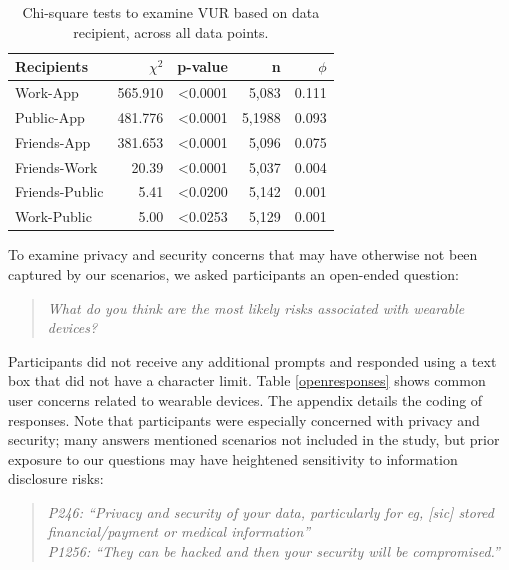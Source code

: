 \documentclass[conference]{IEEEtran}
\begin{document}
\begin{table}[t]
\small
\begin{center}
\begin{tabular}{|l|r|r|r|r|}
\hline
Recipients	& $\chi^2$ & p-value 	& n & $\phi$ \\
\hline
Work-App	& 565.910 & \textless0.0001 & 5,083 & 0.111\\
Public-App	& 481.776 & \textless0.0001 & 5,1988& 0.093\\
Friends-App & 381.653 & \textless0.0001 & 5,096 & 0.075\\
Friends-Work & 20.39 & \textless0.0001 & 5,037 & 0.004\\
Friends-Public & 5.41 & \textless0.0200 & 5,142 & 0.001\\
Work-Public&  5.00 & \textless0.0253 & 5,129	& 0.001\\
\hline
\end{tabular}
\caption{Chi-square tests to examine VUR based on data recipient, across all data points.}
\label{recipient-chi}
\end{center}
\end{table}


To examine privacy and security concerns that may have otherwise not been captured by our scenarios, we asked participants an open-ended question:

\begin{quotation}
\noindent
\textit{What do you think are the most likely risks associated with wearable devices?}
\end{quotation}

Participants did not receive any additional prompts and responded using a text box that did not have a character limit. Table \ref{openresponses} shows common user concerns related to wearable devices. The appendix details the coding of responses. Note that participants were especially concerned with privacy and security; many answers mentioned scenarios not included in the study, but prior exposure to our questions may have heightened sensitivity to information disclosure risks:\\

\begin{quotation}
\noindent
\textit{P246: ``Privacy and security of your data, particularly for eg, [sic] stored financial/payment or medical information''}\\

\noindent
\textit{P1256: ``They can be hacked and then your security will be compromised.''}
\end{quotation}
\end{document}
